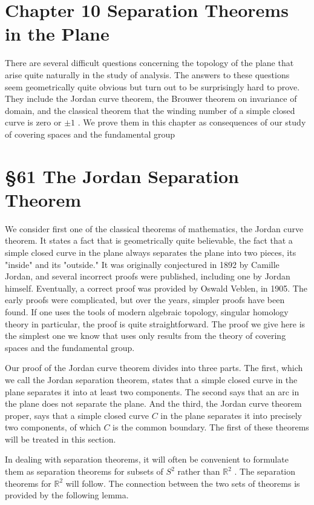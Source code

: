 \documentclass[10pt]{article}
\begin{document}
\section*{Chapter 10 Separation Theorems in the Plane}

There are several difficult questions concerning the topology of the plane that arise quite naturally in the study of analysis. The answers to these questions seem geometrically quite obvious but turn out to be surprisingly hard to prove. They include the Jordan curve theorem, the Brouwer theorem on invariance of domain, and the classical theorem that the winding number of a simple closed curve is zero or \(\pm  1\) . We prove them in this chapter as consequences of our study of covering spaces and the fundamental group

\section*{§61 The Jordan Separation Theorem}

We consider first one of the classical theorems of mathematics, the Jordan curve theorem. It states a fact that is geometrically quite believable, the fact that a simple closed curve in the plane always separates the plane into two pieces, its "inside" and its "outside." It was originally conjectured in 1892 by Camille Jordan, and several incorrect proofs were published, including one by Jordan himself. Eventually, a correct proof was provided by Oswald Veblen, in 1905. The early proofs were complicated, but over the years, simpler proofs have been found. If one uses the tools of modern algebraic topology, singular homology theory in particular, the proof is quite straightforward. The proof we give here is the simplest one we know that uses only results from the theory of covering spaces and the fundamental group.

Our proof of the Jordan curve theorem divides into three parts. The first, which we call the Jordan separation theorem, states that a simple closed curve in the plane separates it into at least two components. The second says that an arc in the plane does not separate the plane. And the third, the Jordan curve theorem proper, says that a simple closed curve \(C\) in the plane separates it into precisely two components, of which \(C\) is the common boundary. The first of these theorems will be treated in this section.

In dealing with separation theorems, it will often be convenient to formulate them as separation theorems for subsets of \({S}^{2}\) rather than \({\mathbb{R}}^{2}\) . The separation theorems for \({\mathbb{R}}^{2}\) will follow. The connection between the two sets of theorems is provided by the following lemma.
\end{document}
